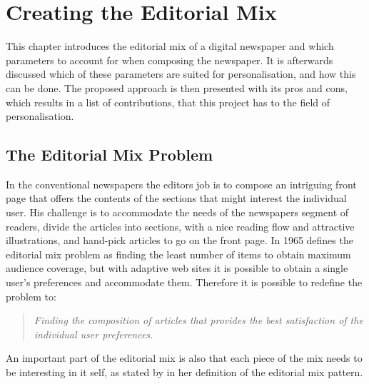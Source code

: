 \chapter{Creating the Editorial Mix} %
\label{ch:introduction}
This chapter introduces the editorial mix of a digital newspaper and which parameters to account for when composing the newspaper. It is afterwards discussed which of these parameters are suited for personalisation, and how this can be done. The proposed approach is then presented with its pros and cons, which results in a list of contributions, that this project has to the field of personalisation.


\section{The Editorial Mix Problem}
In the conventional newspapers the editors job is to compose an intriguing front page that offers the contents of the sections that might interest the individual user. His challenge is to accommodate the needs of the newspapers segment of readers, divide the articles into sections, with a nice reading flow and attractive illustrations, and hand-pick articles to go on the front page. In 1965 \cite{EditorsDilemma} defines the editorial mix problem as finding the least number of items to obtain maximum audience coverage, but with adaptive web sites it is possible to obtain a single user's preferences and accommodate them. Therefore it is possible to redefine the problem to:
\begin{quotation}
	\emph{Finding the composition of articles that provides the best satisfaction of the individual user preferences.}
\end{quotation}
%
An important part of the editorial mix is also that each piece of the mix needs to be interesting in it self, as stated by \cite{Tidwell} in her definition of the editorial mix pattern.

